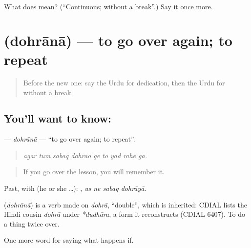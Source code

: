 \begin{tcolorbox}[breakable,colback=teal!4,colframe=teal!35!black,title={Before you move on}]
What does  mean? (\textquotedblleft{}Continuous; without a break\textquotedblright{}.) Say it once more.
\end{tcolorbox}
\section[\texorpdfstring{\ur{دہرانا} (dohrānā)}{دہرانا (dohrānā)}]{ (dohrānā) — to go over again; to repeat}

\label{lesson:UR-C379-dohrana}



\begin{quote}
Before the new one: say the Urdu for dedication, then the Urdu for without a break.
\end{quote}

\subsection*{You'll want to know: }
\textbf{} — \emph{dohrānā} — \textquotedblleft{}to go over again; to repeat\textquotedblright{}.

\begin{quote}
        
\end{quote}

\begin{quote}
\emph{agar tum sabaq dohrāo ge to yād rahe gā.}
\end{quote}

\begin{quote}
If you go over the lesson, you will remember it.
\end{quote}

Past, with  (he or she …):    , \emph{us ne sabaq dohrāyā}.

\begin{cousinweb}
\textbf{} (\emph{dohrānā}) is a verb made on \emph{dohrā}, \textquotedblleft{}double\textquotedblright{}, which is inherited: CDIAL lists the Hindi cousin \emph{dohrā} under \emph{*dudhāra}, a form it reconstructs (CDIAL 6407). To do a thing twice over.
\end{cousinweb}

\begin{grammarlens}[title={What you've built}]
One more word for saying what happens if.
\end{grammarlens}

